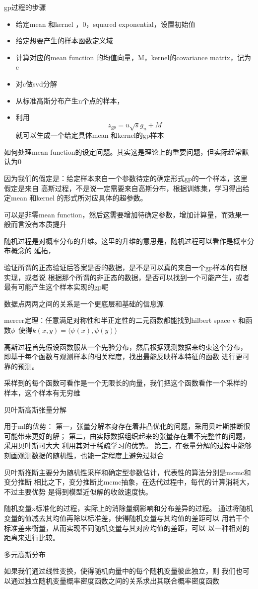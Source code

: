 \documentclass[a4paper, 12pt, CJKnumber, UTF8, openany,nofonts, fancyhdr]{ctexbook}
\begin{document}
gp过程的步骤
\begin{itemize}
\item 给定mean 和kernel ，0，squared exponential，设置初始值
\item  给定想要产生的样本函数定义域
\item 计算对应的mean function 的均值向量，M，kernel的covariance matrix，记为c
\item 对c做svd分解
\item 从标准高斯分布产生n个点的样本，
  \item 利用$$
z_{g p}=u \sqrt{s} g_{n}+M
$$ 就可以生成一个给定具体mean 和kernel的gp样本
 \end{itemize}

 如何处理mean function的设定问题。其实这是理论上的重要问题，但实际经常默认为0

 因为我们的假定是：给定样本来自一个参数待定的确定形式gp的一个样本，这里假定是来自
 高斯过程，不是说一定需要来自高斯分布，根据训练集，学习得出给定mean 和kernel
 的形式所对应具体的超参数。

 可以是非零mean function，然后这需要增加待确定参数，增加计算量，而效果一般而言没有本质提升


 随机过程是对概率分布的升维。这里的升维的意思是，随机过程可以看作是概率分布概念的
 延拓，

 验证所谓的正态验证后答案是否的数据，是不是可以真的来自一个gp样本的有限实现，或者说
 根据那个所谓的非正态的数据，是否可以找到一个可能产生，或者最有可能产生这个样本实现的gp呢

 数据点两两之间的关系是一个更底层和基础的信息源

 mercer定理：任意满足对称性和半正定性的二元函数都能找到hilbert space v 和函数$\phi$\
 使得$k(x, y)=\langle\psi(x), \psi(y)\rangle$


 高斯过程首先假设函数服从一个先验分布，然后根据观测数据来约束这个分布，
 即基于每个函数与观测样本的相关程度，找出最能反映样本特征的函数
 进行更可靠的预测。

 采样到的每个函数可看作是一个无限长的向量，我们把这个函数看作一个采样的
 样本，这个样本有无穷维

 贝叶斯高斯张量分解

 用于ml的优势：
 第一，张量分解本身存在着非凸优化的问题，采用贝叶斯推断很可能带来更好的解；
 第二，由实际数据组织起来的张量存在着不完整性的问题，采用贝叶斯可大大
 利用其对于稀疏学习的优势。
 第三，在张量分解的过程中能够刻画观测数据的随机性，也能一定程度上避免过拟合

 贝叶斯推断主要分为随机性采样和确定型参数估计，代表性的算法分别是mcmc和变分推断
 相比之下，变分推断比mcmc抽象，在迭代过程中，每代的计算消耗大，不过主要优势
 是得到模型近似解的收敛速度快。

 随机变量x标准化的过程，实际上的消除量纲影响和分布差异的过程。
 通过将随机变量的值减去其均值再除以标准差，使得随机变量与其均值的差距可以
 用若干个标准差来衡量，从而实现不同随机变量与其对应均值的差距，可以
 以一种相对的距离来进行比较。

 多元高斯分布

 如果我们通过线性变换，使得随机向量中的每个随机变量彼此独立，则
 我们也可以通过独立随机变量概率密度函数之间的关系求出其联合概率密度函数

 
\end{document}
